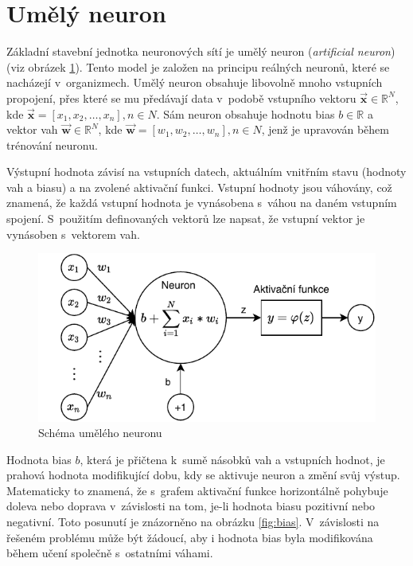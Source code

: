 \section{Umělý neuron}
Základní stavební jednotka neuronových sítí je umělý neuron (\textit{artificial neuron}) (viz obrázek \ref{fig:neuron}). Tento model je založen na principu reálných neuronů, které se nacházejí v~organizmech. Umělý neuron obsahuje libovolně mnoho vstupních propojení, přes které se mu předávají data v~podobě vstupního vektoru $\boldsymbol{\overrightarrow{x}} \in \mathbb{R}^N$, kde $\boldsymbol{\overrightarrow{x}} = [x_1, x_2, \dots, x_n], n \in N$. Sám neuron obsahuje hodnotu bias $b \in \mathbb{R}$ a vektor vah $\boldsymbol{\overrightarrow{w}} \in \mathbb{R}^N$, kde $\boldsymbol{\overrightarrow{w}} = [w_1, w_2, \dots, w_n], n \in N$, jenž je upravován během trénování neuronu.

Výstupní hodnota závisí na vstupních datech, aktuálním vnitřním stavu (hodnoty vah a biasu) a na zvolené aktivační funkci. Vstupní hodnoty jsou váhovány, což znamená, že každá vstupní hodnota je vynásobena s~váhou na daném vstupním spojení. S~použitím definovaných vektorů lze napsat, že vstupní vektor je vynásoben s~vektorem vah.

\begin{figure}[H]
    \centering
    \includegraphics[scale=1.0]{obrazky-figures/perceptron.pdf}
    \caption{\label{fig:neuron}Schéma umělého neuronu}
\end{figure}

Hodnota bias $b$, která je přičtena k~sumě násobků vah a vstupních hodnot, je prahová hodnota modifikující dobu, kdy se aktivuje neuron a změní svůj výstup. Matematicky to znamená, že s~grafem aktivační funkce horizontálně pohybuje doleva nebo doprava v~závislosti na tom, je-li hodnota biasu pozitivní nebo negativní. Toto posunutí je znázorněno na obrázku \ref{fig:bias}. V~závislosti na řešeném problému může být žádoucí, aby i hodnota bias byla modifikována během učení společně s~ostatními váhami.

